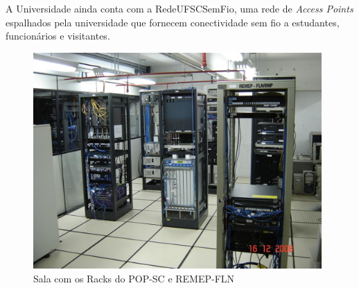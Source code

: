 \documentclass[brazil,times]{abnt}
\begin{document}
A Universidade ainda conta com a RedeUFSCSemFio, uma rede de \emph{Access
Points} espalhados pela universidade que fornecem conectividade sem fio a
estudantes, funcionários e visitantes.

\begin{figure}[htp]
\begin{center}
  \includegraphics[width=110mm]{imagens/sala-racks-setic.jpeg}
  \caption[Sala com os Racks do POP-SC e REMEP-FLN]{Sala com os Racks do POP-SC
  e REMEP-FLN}
  \label{sala-racks}
\end{center}
\end{figure}
% 
% 
% 



\end{document}
